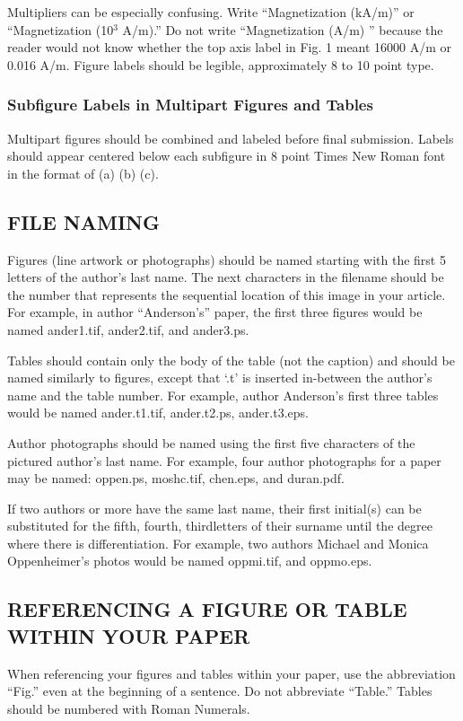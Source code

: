 \documentclass{IEEEoj}
\begin{document}
Multipliers can be especially confusing. Write ``Magnetization (kA/m)'' or 
``Magnetization (10$^{3}$ A/m).'' Do not write ``Magnetization (A/m) 
'' because the reader would not know whether the top axis 
label in Fig. 1 meant 16000 A/m or 0.016 A/m. Figure labels should be 
legible, approximately 8 to 10 point type.

\subsubsection{Subfigure Labels in Multipart Figures and Tables}
Multipart figures should be combined and labeled before final submission. 
Labels should appear centered below each subfigure in 8 point Times New 
Roman font in the format of (a) (b) (c). 

\subsection{FILE NAMING}
Figures (line artwork or photographs) should be named starting with the 
first 5 letters of the author's last name. The next characters in the 
filename should be the number that represents the sequential location of 
this image in your article. For example, in author ``Anderson's'' paper, the 
first three figures would be named ander1.tif, ander2.tif, and ander3.ps.

Tables should contain only the body of the table (not the caption) and 
should be named similarly to figures, except that `.t' is inserted 
in-between the author's name and the table number. For example, author 
Anderson's first three tables would be named ander.t1.tif, ander.t2.ps, 
ander.t3.eps.

Author photographs should be named using the first five characters of the 
pictured author's last name. For example, four author photographs for a 
paper may be named: oppen.ps, moshc.tif, chen.eps, and duran.pdf.

If two authors or more have the same last name, their first initial(s) can 
be substituted for the fifth, fourth, third\textellipsis letters of their surname 
until the degree where there is differentiation. For example, two authors 
Michael and Monica Oppenheimer's photos would be named oppmi.tif, and 
oppmo.eps.

\subsection{REFERENCING A FIGURE OR TABLE WITHIN YOUR PAPER}
When referencing your figures and tables within your paper, use the 
abbreviation ``Fig.'' even at the beginning of a sentence. Do not abbreviate 
``Table.'' Tables should be numbered with Roman Numerals.
\end{document}
